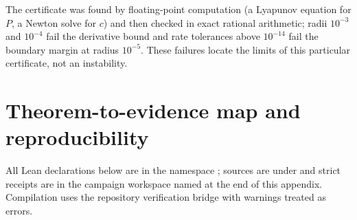 \documentclass[11pt,a4paper]{article}
\theoremstyle{plain}
\theoremstyle{definition}
\theoremstyle{remark}
\begin{document}
The certificate was found by floating-point computation (a Lyapunov equation for $P$, a Newton solve for $c$) and then checked in exact rational arithmetic; radii $10^{-3}$ and $10^{-4}$ fail the derivative bound and rate tolerances above $10^{-14}$ fail the boundary margin at radius $10^{-5}$. These failures locate the limits of this particular certificate, not an instability.

\section{Theorem-to-evidence map and reproducibility}\label{app:evidence}
All Lean declarations below are in the namespace ; sources are under  and strict receipts are in the campaign workspace named at the end of this appendix. Compilation uses the repository verification bridge with warnings treated as errors.
\end{document}
